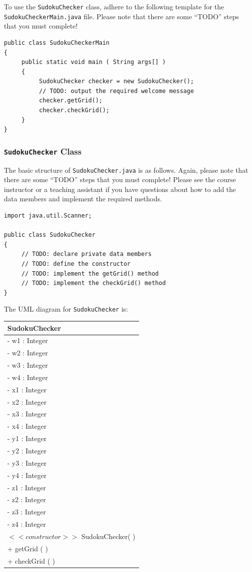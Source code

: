 To use the {\tt SudokuChecker} class, adhere to the following template for the {\tt SudokuCheckerMain.java} file. Please
note that there are some ``TODO'' steps that you must complete!

\begin{verbatim}
public class SudokuCheckerMain
{
     public static void main ( String args[] )
     {
          SudokuChecker checker = new SudokuChecker();
          // TODO: output the required welcome message
          checker.getGrid();
          checker.checkGrid();
     }
}
\end{verbatim}

\subsubsection*{{\tt SudokuChecker} Class}

\noindent The basic structure of {\tt SudokuChecker.java} is as follows. Again, please note that there are some ``TODO''
steps that you must complete! Please see the course instructor or a teaching assistant if you have questions about how
to add the data members and implement the required methods.

\begin{verbatim}
import java.util.Scanner;

public class SudokuChecker
{
     // TODO: declare private data members
     // TODO: define the constructor
     // TODO: implement the getGrid() method
     // TODO: implement the checkGrid() method
}
\end{verbatim}
The UML diagram for {\tt SudokuChecker} is:
\begin{tabular}{|l|}
\hline
\textbf{SudokuChecker} \\
\hline
- w1 : Integer\\
- w2 : Integer\\
- w3 : Integer\\
- w4 : Integer\\
- x1 : Integer\\
- x2 : Integer\\
- x3 : Integer\\
- x4 : Integer\\
- y1 : Integer\\
- y2 : Integer\\
- y3 : Integer\\
- y4 : Integer\\
- z1 : Integer\\
- z2 : Integer\\
- z3 : Integer\\
- z4 : Integer\\
\hline
$<<constructor>>$ SudokuChecker( )\\
\hline
+ getGrid ( )\\
+ checkGrid ( )\\
\hline
\end{tabular}

